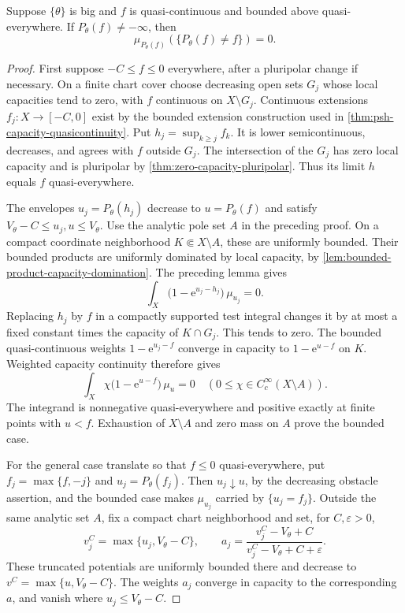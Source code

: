 \begin{theorem}\label{thm:quasicontinuous-obstacle-contact}
Suppose $\{\theta\}$ is big and $f$ is quasi-continuous and bounded above quasi-everywhere. If $P_\theta(f)\ne-\infty$, then
\[
 \mu_{P_\theta(f)}(\{P_\theta(f)\ne f\})=0.
\]
\end{theorem}
\begin{proof}
First suppose $-C\leq f\leq0$ everywhere, after a pluripolar change if necessary. On a finite chart cover choose decreasing open sets $G_j$ whose local capacities tend to zero, with $f$ continuous on $X\setminus G_j$. Continuous extensions $f_j:X\to[-C,0]$ exist by the bounded extension construction used in \cref{thm:psh-capacity-quasicontinuity}. Put $h_j=\sup_{k\geq j}f_k$. It is lower semicontinuous, decreases, and agrees with $f$ outside $G_j$. The intersection of the $G_j$ has zero local capacity and is pluripolar by \cref{thm:zero-capacity-pluripolar}. Thus its limit $h$ equals $f$ quasi-everywhere.

The envelopes $u_j=P_\theta(h_j)$ decrease to $u=P_\theta(f)$ and satisfy $V_\theta-C\leq u_j,u\leq V_\theta$. Use the analytic pole set $A$ in the preceding proof. On a compact coordinate neighborhood $K\Subset X\setminus A$, these are uniformly bounded. Their bounded products are uniformly dominated by local capacity, by \cref{lem:bounded-product-capacity-domination}. The preceding lemma gives
\[
 \int_X\bigl(1-\mathrm e^{u_j-h_j}\bigr)\,\mu_{u_j}=0.
\]
Replacing $h_j$ by $f$ in a compactly supported test integral changes it by at most a fixed constant times the capacity of $K\cap G_j$. This tends to zero. The bounded quasi-continuous weights $1-\mathrm e^{u_j-f}$ converge in capacity to $1-\mathrm e^{u-f}$ on $K$. Weighted capacity continuity therefore gives
\[
 \int_X\chi\bigl(1-\mathrm e^{u-f}\bigr)\,\mu_u=0
 \quad(0\leq\chi\in C_c^\infty(X\setminus A)).
\]
The integrand is nonnegative quasi-everywhere and positive exactly at finite points with $u<f$. Exhaustion of $X\setminus A$ and zero mass on $A$ prove the bounded case.

For the general case translate so that $f\leq0$ quasi-everywhere, put $f_j=\max\{f,-j\}$ and $u_j=P_\theta(f_j)$. Then $u_j\downarrow u$, by the decreasing obstacle assertion, and the bounded case makes $\mu_{u_j}$ carried by $\{u_j=f_j\}$. Outside the same analytic set $A$, fix a compact chart neighborhood and set, for $C,\varepsilon>0$,
\[
 v_j^C=\max\{u_j,V_\theta-C\},\qquad
 a_j=\frac{v_j^C-V_\theta+C}{v_j^C-V_\theta+C+\varepsilon}.
\]
These truncated potentials are uniformly bounded there and decrease to $v^C=\max\{u,V_\theta-C\}$. The weights $a_j$ converge in capacity to the corresponding $a$, and vanish where $u_j\leq V_\theta-C$.


\end{proof}
